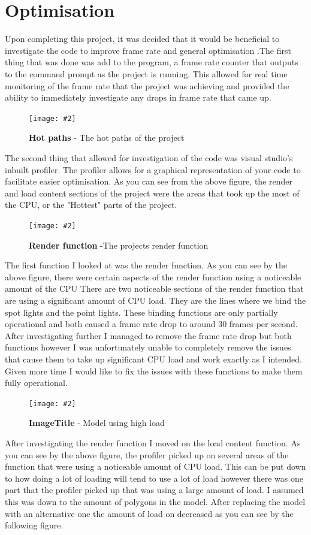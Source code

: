 \documentclass[10pt, a4paper]{article}
\newcommand{\figuremacro}[5]{
    \begin{figure}[#1]
        \centering
        \texttt{[image: \#2]}
        \caption[#3]{\textbf{#3}#4}
        \label{fig:#2}
    \end{figure}
}
\begin{document}
\section{Optimisation}
Upon completing this project, it was decided that it would be beneficial to investigate the code to improve frame rate and general optimisation .The first thing that was done was add to the program, a frame rate counter that outputs to the command prompt as the project is running. This allowed for real time monitoring of the frame rate that the project was achieving and provided the ability to immediately investigate any drops in frame rate that came up.

\figuremacro{h}{hotpath.jpg}{Hot paths}{ - The hot paths of the project}{1.0}

The second thing that allowed for investigation of the code was visual studio's inbuilt profiler. The profiler allows for a graphical representation of your code to facilitate easier optimisation.
As you can see from the above figure, the render and load content sections of the project were the areas that took up the most of the CPU, or the "Hottest" parts of the project. 

\figuremacro{h}{render.jpg}{Render function}{ -The projects render function}{1.0}

The first function I looked at was the render function. As you can see by the above figure, there were certain aspects of the render function using a noticeable amount of the CPU
There are two noticeable sections of the render function that are using a significant amount of CPU load. They are the lines where we bind the spot lights and the point lights.  
These binding functions are only partially operational and both caused a frame rate drop to around 30 frames per second. After investigating further I managed to remove the frame rate drop but 
both functions however I was unfortunately unable to completely remove the issues that cause them to take up significant CPU load and work exactly as I intended. Given more time I would
like to fix the issues with these functions to make them fully operational.

\figuremacro{h}{loadcontent.png}{ImageTitle}{ - Model using high load}{1.0}

After investigating the render function I moved on the load content function. As you can see by the above figure, the profiler picked up on several areas of the function that were using a noticeable amount of CPU load. This can be put down to how doing a lot of loading will tend to use a lot of load however there was one part that the profiler picked up that was using a large 
amount of load. I assumed this was down to the amount of polygons in the model. After replacing the model with an alternative one the amount of load on decreased as you can see by the following figure.
\end{document}
